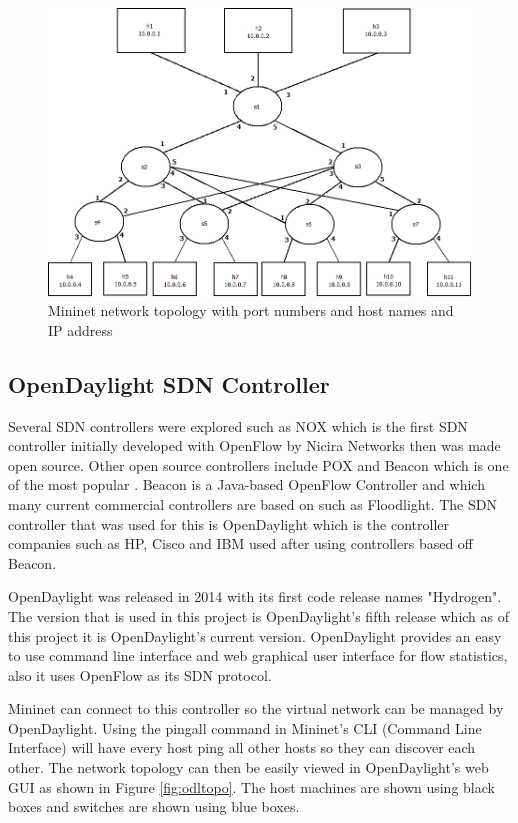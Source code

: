 \begin{figure}[h!]
 \centering
 \includegraphics[width=\linewidth]{images/mnnetwork.png}
 \caption{Mininet network topology with port numbers and host names and IP address}
 \label{fig:mnnetwork}
\end{figure}

\subsection{OpenDaylight SDN Controller}
Several SDN controllers were explored such as NOX which is the first SDN controller initially developed with OpenFlow by Nicira Networks then was made open source. Other open source controllers include POX and Beacon which is one of the most popular \cite{sdncontroller}. Beacon is a Java-based OpenFlow Controller and which many current commercial controllers are based on such as Floodlight. The SDN controller that was used for this is OpenDaylight which is the controller companies such as HP, Cisco and IBM used after using controllers based off Beacon.
\newline
\par
OpenDaylight was released in 2014 with its first code release names "Hydrogen". The version that is used in this project is OpenDaylight's fifth release which as of this project it is OpenDaylight's current version. OpenDaylight provides an easy to use command line interface and web graphical user interface for flow statistics, also it uses OpenFlow as its SDN protocol.
\newline
\par
Mininet can connect to this controller so the virtual network can be managed by OpenDaylight. Using the pingall command in Mininet's CLI (Command Line Interface) will have every host ping all other hosts so they can discover each other. The network topology can then be easily viewed in OpenDaylight's web GUI as shown in Figure \ref{fig:odltopo}. The host machines are shown using black boxes and switches are shown using blue boxes.

